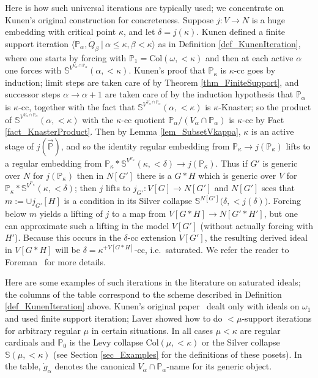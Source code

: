 \documentclass{amsart}
\begin{document}
Here is how such universal iterations are typically used; we concentrate on Kunen's original construction for concreteness.  Suppose $j:V\to N$ is a huge embedding with critical point $\kappa$, and let $\delta = j(\kappa)$.  Kunen defined a finite support iteration $\langle \mathbb{P}_\alpha, \dot{Q}_\beta \ | \ \alpha \le \kappa, \beta < \kappa \rangle$ as in Definition \ref{def_KunenIteration}, where one starts by forcing with $\mathbb{P}_1=\text{Col}(\omega, < \kappa)$ and then at each active $\alpha$ one forces with $\mathbb{S}^{V^{V_\alpha \cap \mathbb{P}_\alpha}}(\alpha, < \kappa)$.  Kunen's proof that $\mathbb{P}_\kappa$ is $\kappa$-cc goes by induction; limit steps are taken care of by Theorem \ref{thm_FiniteSupport}, and successor steps $\alpha \to \alpha+1$ are taken care of by the induction hypothesis that $\mathbb{P}_\alpha$ is $\kappa$-cc, together with the fact that $\mathbb{S}^{V^{V_\alpha \cap \mathbb{P}_\alpha}}(\alpha, < \kappa)$ is $\kappa$-Knaster; so the product of $\mathbb{S}^{V^{V_\alpha \cap \mathbb{P}_\alpha}}(\alpha, < \kappa)$ with the $\kappa$-cc quotient $\mathbb{P}_\alpha/(V_\alpha \cap \mathbb{P}_\alpha)$ is $\kappa$-cc by Fact \ref{fact_KnasterProduct}.  Then by Lemma \ref{lem_SubsetVkappa}, $\kappa$ is an active stage of $j(\vec{\mathbb{P}})$, and so the identity regular embedding from $\mathbb{P}_\kappa \to j(\mathbb{P}_\kappa)$ lifts to a regular embedding from $\mathbb{P}_\kappa * \mathbb{S}^{V^{\mathbb{P}_\kappa}}(\kappa, < \delta) \to j(\mathbb{P}_\kappa)$.  Thus if $G'$ is generic over $N$ for $j(\mathbb{P}_\kappa)$ then in $N[G']$ there is a $G*H$ which is generic over $V$ for $\mathbb{P}_\kappa * \mathbb{S}^{V^{\mathbb{P}_\kappa}}(\kappa, < \delta)$; then $j$ lifts to $j_{G'}: V[G] \to N[G']$ and $N[G']$ sees that $m:= \cup j_{G'}[H]$ is a condition in its Silver collapse $\mathbb{S}^{N[G']}\big( \delta, < j(\delta) \big)$.  Forcing below $m$ yields a lifting of $j$ to a map from $V[G*H] \to N[G' * H']$, but one can approximate such a lifting in the model $V[G']$ (without actually forcing with $H'$).  Because this occurs in the $\delta$-cc extension $V[G']$, the resulting derived ideal in $V[G*H]$ will be $\delta = \kappa^{+V[G*H]}$-cc, i.e.\ saturated.  We refer the reader to Foreman~\cite{MattHandbook} for more details.

Here are some examples of such iterations in the literature on saturated ideals; the columns of the table correspond to the scheme described in Definition \ref{def_KunenIteration} above.  Kunen's original paper~\cite{MR495118} dealt only with ideals on $\omega_1$ and used finite support iteration; Laver showed how to do $<\mu$-support iterations for arbitrary regular $\mu$ in certain situations.  In all cases $\mu < \kappa$ are regular cardinals and $\mathbb{P}_0$ is the Levy collapse $\text{Col}(\mu, < \kappa)$ or the Silver collapse $\mathbb{S}(\mu, < \kappa)$ (see Section \ref{sec_Examples} for the definitions of these posets).  In the table, $\dot{g}_\alpha$ denotes the canonical $V_\alpha \cap \mathbb{P}_\alpha$-name for its generic object.
\end{document}
